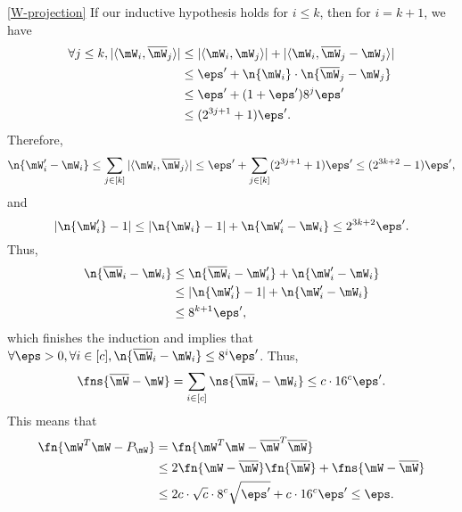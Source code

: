 \begin{proofof}{\cref{W-projection}}
If our inductive hypothesis holds for $i\leq k$, then for $i=k+1$, we have 
\begin{equation}\begin{split}
    \forall j\leq k, |\langle \mW_i, \overline{\mW}_j\rangle|&\leq |\langle \mW_i, \mW_j\rangle| + |\langle \mW_i, \overline{\mW}_j-\mW_j\rangle|\\
                                                         &\leq \eps'+ \n{\mW_i}\cdot\n{\overline{\mW}_j-\mW_j}\\
                                                         &\leq \eps'+ (1+\eps')8^j\eps'\\
                                                         &\leq (2^{3j+1}+1)\eps'.
\end{split}\end{equation}
Therefore,
\begin{equation}
    \n{\mW_i'-\mW_i}\leq \sum_{j\in[k]} |\langle \mW_i, \overline{\mW}_j\rangle|\leq \eps'+\sum_{j\in[k]}(2^{3j+1}+1)\eps'\leq (2^{3k+2} - 1)\eps',
\end{equation}
and
\begin{equation}
    |\n{\mW_i'}-1|\leq |\n{\mW_i}-1| + \n{\mW_i'-\mW_i}\leq 2^{3k+2}\eps'.
\end{equation}
Thus,
\begin{equation}\begin{split}
    \n{\overline{\mW}_i-\mW_i}&\leq \n{\overline{\mW}_i-\mW_i'} + \n{\mW_i'-\mW_i}\\
                          &\leq |\n{\mW_i'}-1| + \n{\mW_i'-\mW_i}\\
                          &\leq 8^{k+1}\eps',
\end{split}\end{equation}
which finishes the induction and implies that $\forall \eps>0, \forall i\in[c], \n{\overline{\mW}_i-\mW_i}\leq 8^{i}\eps'$. Thus,
\begin{equation}
\label{eqn:W-equal-W-bar}
    \fns{\overline{\mW}-\mW} = \sum_{i\in[c]} \ns{\overline{\mW}_i-\mW_i}\leq c\cdot 16^c\eps'.
\end{equation}
This means that
\begin{equation}\begin{split}
    \fn{\mW^T\mW-P_\mW} &= \fn{\mW^T\mW-\overline{\mW}^T\overline{\mW}}\\
                  &\leq 2\fn{\mW-\overline{\mW}}\fn{\overline{\mW}} + \fns{\mW-\overline{\mW}}\\
                  &\leq 2c\cdot\sqrt{c}\cdot 8^c\sqrt{\eps'} + c\cdot 16^c\eps'\leq \eps.
\end{split}\end{equation}

\end{proofof}

